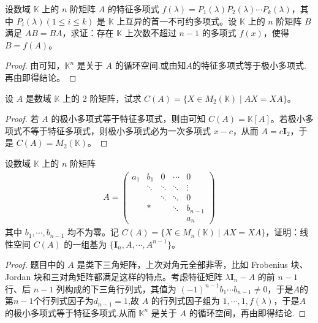 \documentclass[../../main.tex]{subfiles}%
\begin{document}
\begin{example}
设数域 $\mathbb{K}$ 上的 $n$ 阶矩阵 $A$ 的特征多项式 $f(\lambda)=P_1(\lambda)P_2(\lambda)\cdots P_k(\lambda)$，其中 $P_i(\lambda) (1\leqslant  i\leqslant  k)$ 是 $\mathbb{K}$ 上互异的首一不可约多项式。设 $\mathbb{K}$ 上的 $n$ 阶矩阵 $B$ 满足 $AB = BA$，求证：存在 $\mathbb{K}$ 上次数不超过 $n - 1$ 的多项式 $f(x)$，使得 $B = f(A)$。
\end{example}
\begin{proof}

由可知，$\mathbb{K}^n$ 是关于 $A$ 的循环空间.或由知$A$的特征多项式等于极小多项式.再由即得结论。

\end{proof}

\begin{example}
设 $A$ 是数域 $\mathbb{K}$ 上的 $2$ 阶矩阵，试求 $C(A)=\{X\in M_2(\mathbb{K})\mid AX = XA\}$。
\end{example}
\begin{proof}

若 $A$ 的极小多项式等于特征多项式，则由可知 $C(A)=\mathbb{K}[A]$。若极小多项式不等于特征多项式，则极小多项式必为一次多项式 $x - c$，从而 $A = c\boldsymbol{I}_2$，于是 $C(A)=M_2(\mathbb{K})$。

\end{proof}

\begin{example}
设数域 $\mathbb{K}$ 上的 $n$ 阶矩阵
\begin{align*}
A=\begin{pmatrix}
a_1 & b_1 & 0 & \cdots & 0 \\
& \ddots & \ddots & \ddots & \vdots \\
& & \ddots & \ddots & 0 \\
& * & & \ddots & b_{n - 1} \\
& & & & a_n
\end{pmatrix}
\end{align*}
其中 $b_1,\cdots,b_{n - 1}$ 均不为零。记 $C(A)=\{X\in M_n(\mathbb{K})\mid AX = XA\}$，证明：线性空间 $C(A)$ 的一组基为 $\{\boldsymbol{I}_n,A,\cdots,A^{n - 1}\}$。
\end{example}
\begin{proof}

题目中的 $A$ 是类下三角矩阵，上次对角元全部非零，比如 Frobenius 块、Jordan 块和三对角矩阵都满足这样的特点。考虑特征矩阵 $\lambda\boldsymbol{I}_n - A$ 的前 $n - 1$ 行、后 $n - 1$ 列构成的下三角行列式，其值为 $(-1)^{n - 1}b_1\cdots b_{n - 1}\neq 0$，于是$A$的第$n-1$个行列式因子为$d_{n-1}=1$,故 $A$ 的行列式因子组为 $1,\cdots,1,f(\lambda)$，于是$A$的极小多项式等于特征多项式.从而 $\mathbb{K}^n$ 是关于 $A$ 的循环空间，再由即得结论.

\end{proof}
\end{document}
